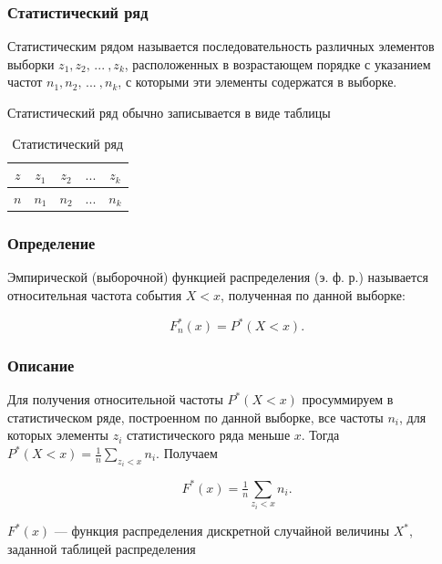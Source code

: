 \documentclass[a4paper,14pt]{article}
\begin{document}
	\subsubsection{Статистический ряд}
	
	Статистическим рядом называется последовательность различных элементов выборки $z_1, z_2, \, ... \: , z_k$, расположенных в возрастающем порядке с указанием частот $n_1, n_2, \, ... \: , n_k$, с которыми эти элементы содержатся в выборке.
	
	Статистический ряд обычно записывается в виде таблицы
	
	\begin{table}[h!]
		\begin{center}
			\begin{tabular}{|c|c|c|c|c|}
				\hline
				$z$ & $z_1$ & $z_2$ & $...$ & $z_k$ \\
				\hline
				$n$ & $n_1$ & $n_2$ & $...$ & $n_k$ \\
				\hline
			\end{tabular}
		\end{center}
		\caption{Статистический ряд}
	\end{table} 
	
	\subsubsection{Определение}
	
	Эмпирической (выборочной) функцией распределения (э. ф. р.) называется относительная частота события $X < x$, полученная по данной выборке:
	
	\begin{equation}
		F_n^*(x) = P^*(X < x).
	\end{equation}
	
	\subsubsection{Описание}
	
	Для получения относительной частоты $P^*(X < x)$ просуммируем в статистическом ряде, построенном по данной выборке, все частоты $n_i$, для которых элементы $z_i$ статистического ряда меньше $x$. Тогда $P^*(X < x) = \tfrac{1}{n}\sum\limits_{z_i < x}n_i$. Получаем
	
	\begin{equation}
		F^*(x) = \tfrac{1}{n}\sum\limits_{z_i < x}n_i.
	\end{equation}
	
	$F^*(x)$ --- функция распределения дискретной случайной величины $X^*$, заданной таблицей распределения
	
\end{document}
